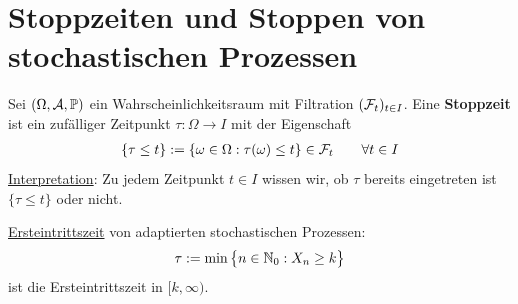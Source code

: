 
\chapter{Stoppzeiten und Stoppen von stochastischen Prozessen} %

\begin{defi}[Stoppzeit]\enter
	Sei $(\Omega,\mathcal{A},\mathbb{P})$ ein Wahrscheinlichkeitsraum mit Filtration $(\mathcal{F}_t)_{t\in I}$.
	Eine \textbf{Stoppzeit} ist ein zufälliger Zeitpunkt $\tau:\Omega\to I$ mit der Eigenschaft
	\begin{align*}
		\lbrace\tau\leq t\rbrace:=\lbrace\omega\in\Omega:\tau(\omega)\leq t\rbrace\in\mathcal{F}_t\qquad\forall t\in I
	\end{align*}
	\ul{Interpretation}: Zu jedem Zeitpunkt $t\in I$ wissen wir, ob $\tau$ bereits eingetreten ist $\lbrace\tau\leq t\rbrace$ oder nicht.
\end{defi}

\begin{beisp}\enter
	\ul{Ersteintrittszeit} von adaptierten stochastischen Prozessen:
	\begin{align*}
		\tau:=\min\big\lbrace n\in\mathbb{N}_0:X_n\geq k\big\rbrace
	\end{align*}
	ist die Ersteintrittszeit in $[k,\infty)$.
\end{beisp}


